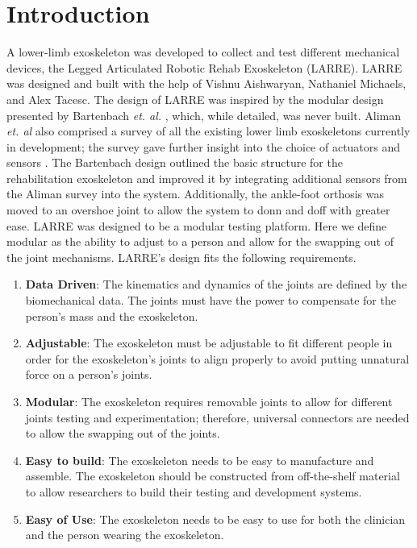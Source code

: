 \section{Introduction}
A lower-limb exoskeleton was developed to collect and test different mechanical devices, the Legged Articulated Robotic Rehab Exoskeleton (LARRE). LARRE was designed and built with the help of Vishnu Aishwaryan, Nathaniel Michaels, and Alex Tacesc. The design of LARRE was inspired by the modular design presented by Bartenbach \textit{et. al.} \cite{7523699}, which, while detailed, was never built. Aliman \textit{et. al} also comprised a survey of all the existing lower limb exoskeletons currently in development; the survey gave further insight into the choice of actuators and sensors \cite{aliman2017design}. The Bartenbach design outlined the basic structure for the rehabilitation exoskeleton and improved it by integrating additional sensors from the Aliman survey into the system. Additionally, the ankle-foot orthosis was moved to an overshoe joint to allow the system to donn and doff with greater ease.
LARRE was designed to be a modular testing platform. Here we define modular as the ability to adjust to a person and allow for the swapping out of the joint mechanisms. LARRE's design fits the following requirements. 


\begin{enumerate}[noitemsep]
\item \textbf{Data Driven}: The kinematics and dynamics of the joints are defined by the biomechanical data. The joints must have the power to compensate for the person's mass and the exoskeleton. 
\item \textbf{Adjustable}: The exoskeleton must be adjustable to fit different people in order for the exoskeleton's joints to align properly to avoid putting unnatural force on a person's joints. 
\item \textbf{Modular}: The exoskeleton requires removable joints to allow for different joints testing and experimentation; therefore, universal connectors are needed to allow the swapping out of the joints. 
\item \textbf{Easy to build}: The exoskeleton needs to be easy to manufacture and assemble. The exoskeleton should be constructed from off-the-shelf material to allow researchers to build their testing and development systems. 
\item \textbf{Easy of Use}: The exoskeleton needs to be easy to use for both the clinician and the person wearing the exoskeleton. 
\end{enumerate}

